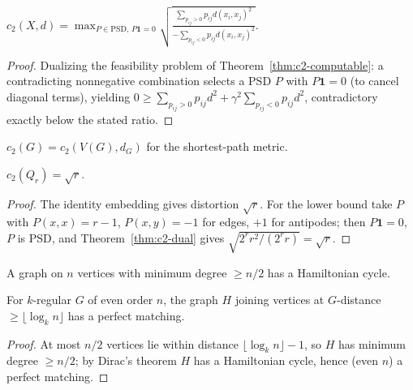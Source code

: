 \begin{theorem}
  \label{thm:c2-dual}
  $c_2(X,d)=\max_{P\in\mathrm{PSD},\,P\mathbf 1=0}
  \sqrt{\frac{\sum_{p_{ij}>0}p_{ij}d(x_i,x_j)^2}{-\sum_{p_{ij}<0}p_{ij}d(x_i,x_j)^2}}$.
\end{theorem}
\begin{proof}
  Dualizing the feasibility problem of Theorem~\ref{thm:c2-computable}: a
  contradicting nonnegative combination selects a PSD $P$ with $P\mathbf 1=0$
  (to cancel diagonal terms), yielding $0\ge\sum_{p_{ij}>0}p_{ij}d^2+\gamma^2
  \sum_{p_{ij}<0}p_{ij}d^2$, contradictory exactly below the stated ratio.
\end{proof}

\begin{definition}[$c_2$ of a graph]
  \label{def:c2-graph}
  $c_2(G)=c_2(V(G),d_G)$ for the shortest-path metric.
\end{definition}

\begin{claim}
  \label{claim:cube-distortion}
  $c_2(Q_r)=\sqrt r$.
\end{claim}
\begin{proof}
  The identity embedding gives distortion $\sqrt r$. For the lower bound take
  $P$ with $P(x,x)=r-1$, $P(x,y)=-1$ for edges, $+1$ for antipodes; then
  $P\mathbf 1=0$, $P$ is PSD, and Theorem~\ref{thm:c2-dual} gives
  $\sqrt{2^rr^2/(2^rr)}=\sqrt r$.
\end{proof}

\begin{lemma}
  \label{thm:dirac}
  \mathlibok
  A graph on $n$ vertices with minimum degree $\ge n/2$ has a Hamiltonian cycle.
\end{lemma}

\begin{lemma}
  \label{lem:far-matching}
  For $k$-regular $G$ of even order $n$, the graph $H$ joining vertices at
  $G$-distance $\ge\lfloor\log_kn\rfloor$ has a perfect matching.
\end{lemma}
\begin{proof}
  At most $n/2$ vertices lie within distance $\lfloor\log_kn\rfloor-1$, so $H$
  has minimum degree $\ge n/2$; by Dirac's theorem $H$ has a Hamiltonian cycle,
  hence (even $n$) a perfect matching.
\end{proof}


